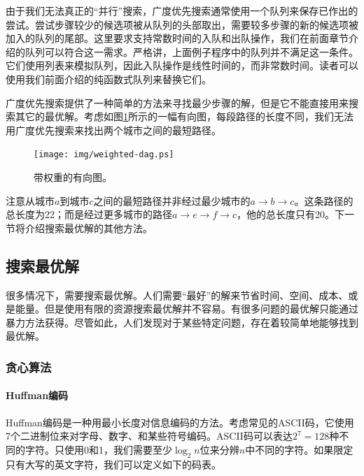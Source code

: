 \documentclass[UTF8]{article}
\begin{document}
由于我们无法真正的“并行”搜索，广度优先搜索通常使用一个队列来保存已作出的尝试。尝试步骤较少的候选项被从队列的头部取出，需要较多步骤的新的候选项被加入的队列的尾部。这里要求支持常数时间的入队和出队操作，我们在前面章节介绍的队列可以符合这一需求。严格讲，上面例子程序中的队列并不满足这一条件。它们使用列表来模拟队列，因此入队操作是线性时间的，而非常数时间。读者可以使用我们前面介绍的纯函数式队列来替换它们。

广度优先搜索提供了一种简单的方法来寻找最少步骤的解，但是它不能直接用来搜索其它的最优解。考虑如图\ref{fig:weighted-dag}所示的一幅有向图，每段路径的长度不同，我们无法用广度优先搜索来找出两个城市之间的最短路径。

\begin{figure}[htbp]
 \centering
 \texttt{[image: img/weighted-dag.ps]}
 \caption{带权重的有向图。}
 \label{fig:weighted-dag}
\end{figure}

注意从城市$a$到城市$c$之间的最短路径并非经过最少城市的$a \to b \to c$。这条路径的总长度为22；而是经过更多城市的路径$a \to e \to f \to c$，他的总长度只有20。下一节将介绍搜索最优解的其他方法。

\subsection{搜索最优解}

很多情况下，需要搜索最优解。人们需要“最好”的解来节省时间、空间、成本、或是能量。但是使用有限的资源搜索最优解并不容易。有很多问题的最优解只能通过暴力方法获得。尽管如此，人们发现对于某些特定问题，存在着较简单地能够找到最优解。

\subsubsection{贪心算法}

\paragraph{Huffman编码}

Huffman编码是一种用最小长度对信息编码的方法。考虑常见的ASCII码，它使用7个二进制位来对字母、数字、和某些符号编码。ASCII码可以表达$2^7 = 128$种不同的字符。只使用0和1，我们需要至少$\log_2 n$位来分辨$n$中不同的字符。如果限定只有大写的英文字符，我们可以定义如下的码表。
\end{document}
